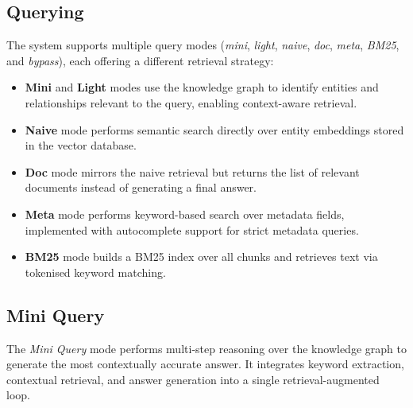 \subsection{Querying}

The system supports multiple query modes (\textit{mini}, \textit{light}, \textit{naive}, \textit{doc}, \textit{meta}, \textit{BM25}, and \textit{bypass}), each offering a different retrieval strategy:
\begin{itemize}
    \item \textbf{Mini} and \textbf{Light} modes use the knowledge graph to identify entities and relationships relevant to the query, enabling context-aware retrieval.
    \item \textbf{Naive} mode performs semantic search directly over entity embeddings stored in the vector database.
    \item \textbf{Doc} mode mirrors the naive retrieval but returns the list of relevant documents instead of generating a final answer.
    \item \textbf{Meta} mode performs keyword-based search over metadata fields, implemented with autocomplete support for strict metadata queries.
    \item \textbf{BM25} mode builds a BM25 index over all chunks and retrieves text via tokenised keyword matching.
\end{itemize}
\subsection{Mini Query}

The \textit{Mini Query} mode performs multi-step reasoning over the knowledge graph to generate the most contextually accurate answer.  
It integrates keyword extraction, contextual retrieval, and answer generation into a single retrieval-augmented loop.

